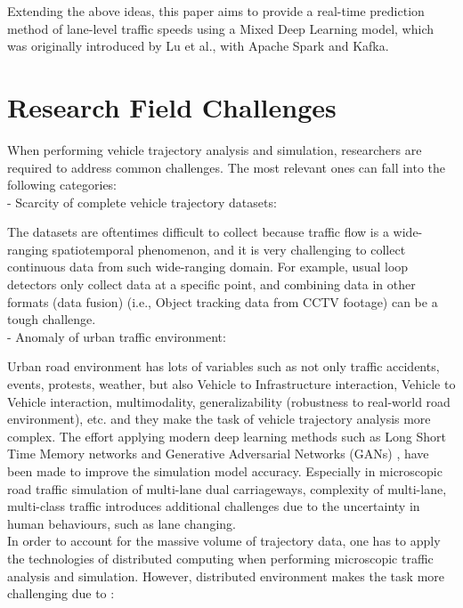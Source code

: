 \documentclass{article}
\begin{document}
Extending the above ideas, this paper aims to provide a real-time prediction method of lane-level traffic speeds using a Mixed Deep Learning model, which was originally introduced by Lu et al.\cite{9284587}, with Apache Spark and Kafka. 

\section{Research Field Challenges}
\label{sec:challenges} %
When performing vehicle trajectory analysis and simulation, researchers are required to address common challenges. The most relevant ones can fall into the following categories: \\

- Scarcity of complete vehicle trajectory datasets: 

The datasets are oftentimes difficult to collect because traffic flow is a wide-ranging spatiotemporal phenomenon, and it is very challenging to collect continuous data from such wide-ranging domain\cite{seo2020evaluation}. For example, usual loop detectors only collect data at a specific point, and combining data in other formats (data fusion) (i.e., Object tracking data from CCTV footage) can be a tough challenge. \\

- Anomaly of urban traffic environment: 

Urban road environment has lots of variables such as not only traffic accidents, events, protests, weather, but also Vehicle to Infrastructure interaction, Vehicle to Vehicle interaction, multimodality, generalizability (robustness to real-world road environment), etc. and they make the task of vehicle trajectory analysis more complex. The effort applying modern deep learning methods such as Long Short Time Memory networks and Generative Adversarial Networks (GANs) \cite{rossi2021vehicle}, have been made to improve the simulation model accuracy. Especially in microscopic road traffic simulation of multi-lane dual carriageways, complexity of multi-lane, multi-class traffic introduces additional challenges due to the uncertainty in human behaviours, such as lane changing\cite{DAHIYA2022100066}. \\

In order to account for the massive volume of trajectory data, one has to apply the technologies of distributed computing when performing microscopic traffic analysis and simulation. However, distributed environment makes the task more challenging due to \cite{yu2020dissecting}: \\
\end{document}
